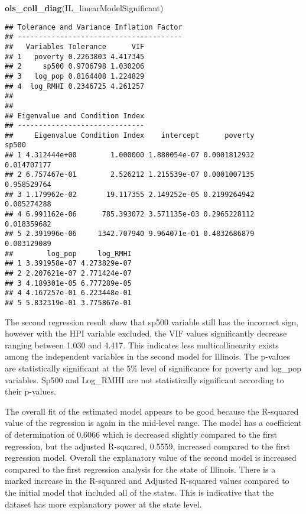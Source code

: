 \documentclass[
]{article}
\newenvironment{Shaded}{\begin{snugshade}}{\end{snugshade}}
\newcommand{\KeywordTok}[1]{\textcolor[rgb]{0.13,0.29,0.53}{\textbf{#1}}}
\newcommand{\NormalTok}[1]{#1}
\begin{document}
\begin{Shaded}
\begin{Highlighting}[]
\KeywordTok{ols_coll_diag}\NormalTok{(IL_linearModelSignificant)}
\end{Highlighting}
\end{Shaded}

\begin{verbatim}
## Tolerance and Variance Inflation Factor
## ---------------------------------------
##   Variables Tolerance      VIF
## 1   poverty 0.2263803 4.417345
## 2     sp500 0.9706798 1.030206
## 3   log_pop 0.8164408 1.224829
## 4  log_RMHI 0.2346725 4.261257
## 
## 
## Eigenvalue and Condition Index
## ------------------------------
##     Eigenvalue Condition Index    intercept      poverty       sp500
## 1 4.312444e+00        1.000000 1.880054e-07 0.0001812932 0.014707177
## 2 6.757467e-01        2.526212 1.215539e-07 0.0001007135 0.958529764
## 3 1.179962e-02       19.117355 2.149252e-05 0.2199264942 0.005274288
## 4 6.991162e-06      785.393072 3.571135e-03 0.2965228112 0.018359682
## 5 2.391996e-06     1342.707940 9.964071e-01 0.4832686879 0.003129089
##        log_pop     log_RMHI
## 1 3.391958e-07 4.273829e-07
## 2 2.207621e-07 2.771424e-07
## 3 4.189301e-05 6.777289e-05
## 4 4.167257e-01 6.223448e-01
## 5 5.832319e-01 3.775867e-01
\end{verbatim}

The second regression result show that sp500 variable still has the
incorrect sign, however with the HPI variable excluded, the VIF values
significantly decrease ranging between 1.030 and 4.417. This indicates
less multicollinearity exists among the independent variables in the
second model for Illinois. The p-values are statistically significant at
the 5\% level of significance for poverty and log\_pop variables. Sp500
and Log\_RMHI are not statistically significant according to their
p-values.

The overall fit of the estimated model appears to be good because the
R-squared value of the regression is again in the mid-level range. The
model has a coefficient of determination of 0.6066 which is decreased
slightly compared to the first regression, but the adjusted R-squared,
0.5559, increased compared to the first regression model. Overall the
explanatory value of the second model is increased compared to the first
regression analysis for the state of Illinois. There is a marked
increase in the R-squared and Adjusted R-squared values compared to the
initial model that included all of the states. This is indicative that
the dataset has more explanatory power at the state level.
\end{document}
